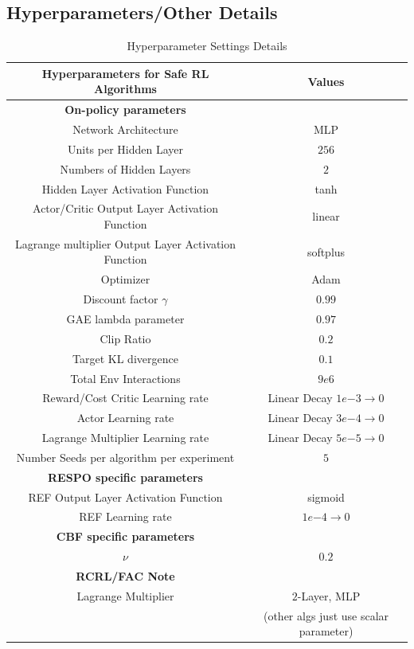\documentclass{article}
\theoremstyle{definition}
\begin{document}
\subsection{Hyperparameters/Other Details}
\begin{table}[h]
    \centering
    \begin{tabular}{c|c}
    Hyperparameters for Safe RL Algorithms & Values \\\hline
    \textbf{On-policy parameters} &\\
    Network Architecture & MLP \\
    Units per Hidden Layer & $256$ \\
    Numbers of Hidden Layers & $2$ \\
    Hidden Layer Activation Function & tanh \\
    Actor/Critic Output Layer Activation Function & linear \\
    Lagrange multiplier Output Layer Activation Function & softplus \\
    Optimizer & Adam \\
    Discount factor $\gamma$ & $0.99$ \\
    GAE lambda parameter & $0.97$ \\
    Clip Ratio & $0.2$ \\
    Target KL divergence & $0.1$ \\
    Total Env Interactions & $9e6$ \\
    Reward/Cost Critic Learning rate & Linear Decay $1e{-3}\rightarrow 0$\\
    Actor Learning rate & Linear Decay $3e{-4}\rightarrow 0$\\
    Lagrange Multiplier Learning rate & Linear Decay $5e{-5}\rightarrow 0$\\
    Number Seeds per algorithm per experiment & $5$\\\hline
    
    \textbf{RESPO specific parameters} &\\
    REF Output Layer Activation Function & sigmoid \\
    REF Learning rate & $1e{-4}\rightarrow 0$\\\hline

    \textbf{CBF specific parameters} &\\
    $\nu$ & $0.2$\\\hline
    
    \textbf{RCRL/FAC Note} &\\
    Lagrange Multiplier & $2$-Layer, MLP\\
     & (other algs just use scalar parameter) \\\hline
    
    \end{tabular}
    \vspace*{1mm}
    \caption{Hyperparameter Settings Details}
    \label{appendix_table:parameter_settings}
\end{table}
\end{document}

